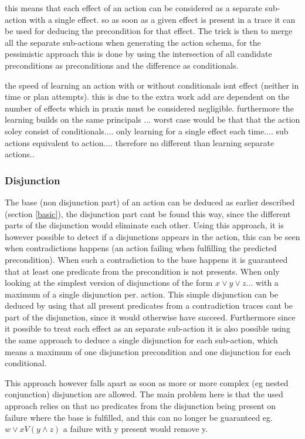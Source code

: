 	
	this means that each effect of an action can be considered as a separate sub-action with a single effect. so as soon as a given effect is present in a trace it can be used for deducing the precondition for that effect. The trick is then to merge all the separate sub-actions when generating the action schema, for the pessimistic approach this is done by using the intersection of all candidate preconditions as preconditions and the difference as conditionals.
	
	the speed of learning an action with or without conditionals isnt effect (neither in time or plan attempts). this is due to the extra work add are dependent on the number of effects which in praxis must be considered negligible. furthermore the learning builds on the same principals ...  worst case would be that that the action soley consist of conditionals.... only learning for a single effect each time.... sub actions equivalent to action.... therefore no different than learning separate actions.. 
	

\subsubsection{Disjunction}
	The base (non disjunction part) of an action can be deduced as earlier described (section \ref{basic}), the disjunction part cant be found this way, since the different parts of the disjunction would eliminate each other. Using this approach, it is however possible to detect if a disjunctions appears in the action, this can be seen when contradictions happens (an action failing when fulfilling the predicted precondition). When such a contradiction to the base happens it is guaranteed that at least one predicate from the precondition is not presents. When only looking at the simplest version of disjunctions of the form $ x \lor y \lor z...$ with a maximum of a single disjunction per. action. This simple disjunction can be deduced by using that all present predicates from a contradiction traces cant be part of the disjunction, since it would otherwise have succeed. Furthermore since it possible to treat each effect as an separate sub-action it is also possible using the same approach to deduce a single disjunction for each sub-action, which means a maximum of one disjunction precondition and one disjunction for each conditional. 
	
	This approach however falls apart as soon as more or more complex (eg nested conjunction) disjunction are allowed. The main problem here is that the used approach relies on that no predicates from the disjunction being present on failure where the base is fulfilled, and this can no longer be guaranteed eg. $w \lor x V (y \land z )$ a failure with y present would remove y. 
	
